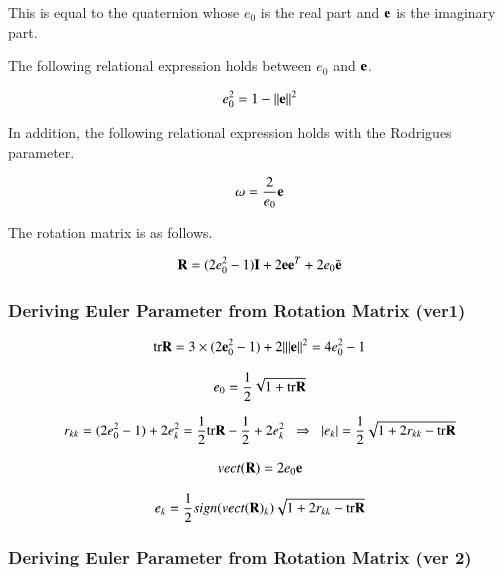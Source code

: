 This is equal to the quaternion whose $e_0$ is the real part and $\mathbf{e}$ is the imaginary part.

The following relational expression holds between $e_0$ and $\mathbf{e}$.

\begin{equation}
e_0^2 = 1-||\mathbf{e}||^2
\end{equation}

In addition, the following relational expression holds with the Rodrigues parameter.

\begin{equation}
\mathbf{\omega} = \frac{2}{e_0}\mathbf{e}
\end{equation}

The rotation matrix is ​​as follows.

\begin{tcolorbox}[title=rotation matrix]
\begin{equation}
\mathbf{R} = (2e_0^2-1)\mathbf{I} + 2\mathbf{e}\mathbf{e}^T + 2e_0\tilde{\mathbf{e}}
\end{equation}
\end{tcolorbox}

\subsubsection{Deriving Euler Parameter from Rotation Matrix (ver1)}


\begin{equation}
{\rm tr}{\mathbf{R}} = 3\times(2\mathbf{e}_0^2 - 1) +  2\||\mathbf{e}||^2 = 4e_0^2 - 1
\end{equation}


\begin{equation}
e_0 = \frac{1}{2}\sqrt{1+{\rm tr}{\mathbf{R}}}
\end{equation}


\begin{equation}
r_{kk} = (2e_0^2-1) + 2e_k^2 = \frac{1}{2}{\rm tr}{\mathbf{R}} - \frac{1}{2} + 2e_k^2\;\;\Rightarrow \;\; |e_k| = \frac{1}{2}\sqrt{1+2r_{kk} -{\rm tr}{\mathbf{R}}}
\end{equation}


\begin{equation}
vect(\mathbf{R}) = 2e_0\mathbf{e}
\end{equation}


\begin{equation}
e_k = \frac{1}{2}sign(vect(\mathbf{R})_k)\sqrt{1+2r_{kk} -{\rm tr}{\mathbf{R}}}
\end{equation}


\subsubsection{Deriving Euler Parameter from Rotation Matrix (ver 2)}

